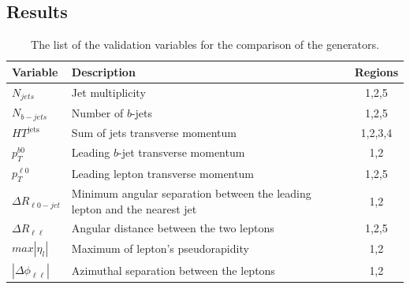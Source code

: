 \subsection{Results}
\begin{table}[]
\begin{center}
\caption{\label{tab:ttw_varlist}
The list of the validation variables for the comparison of the \ttW generators.}
\vspace{0.25cm}
{\small
\setlength\tabcolsep{1.5pt}
\begin{tabular}{l|l|c}
\hline\hline
Variable & Description & Regions \\ \hline
$N_{jets}$   &     Jet multiplicity        &      1,2,5   \\ %
 $N_{b-jets}$       &     Number of  $b$-jets       &   1,2,5      \\ %
$HT^{\text{jets}}$      &   Sum of jets transverse momentum         &  1,2,3,4       \\ %
$p_T^{b0}$       &      Leading $b$-jet transverse momentum       &   1,2      \\ %
 $p_T^{\ell 0}$      &   Leading lepton transverse momentum           &     1,2,5    \\ %
$\Delta R _{ \ell 0-jet }$      &     Minimum angular separation between the leading lepton and the nearest jet         &  1,2       \\ %
$\Delta R _{\ell \ell }$      &       Angular distance between the two leptons      &    1,2,5    \\ %
$max |\eta _l|$      &      Maximum of lepton's pseudorapidity       &     1,2    \\ %
    $|\Delta \phi _{\ell \ell }|$    &    Azimuthal separation between the leptons         & 1,2    \\
    \hline\hline    
\end{tabular}
}
\end{center}
\end{table}


